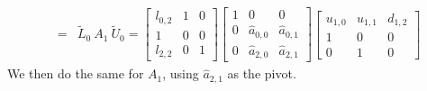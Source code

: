 \begin{eqnarray*}
& = &
{\tilde L}_0 \ A_1 \ {\tilde U}_0
=
\left \lbrack \begin{array}{ccc}
l_{0,2} & 1 & 0 \\
1 & 0 & 0 \\
l_{2,2} & 0 & 1
\end{array} \right \rbrack
\left \lbrack \begin{array}{ccc}
1 & 0 & 0 \\
0 & {\hat a}_{0,0} & {\hat a}_{0,1} \\
0 & {\hat a}_{2,0} & {\hat a}_{2,1}
\end{array} \right \rbrack
\left \lbrack \begin{array}{ccc}
u_{1,0} & u_{1,1} & d_{1,2} \\
1 & 0 & 0 \\
0 & 1 & 0
\end{array} \right \rbrack
\end{eqnarray*}
We then do the same for $A_1$, using ${\hat a}_{2,1}$ as the pivot.
